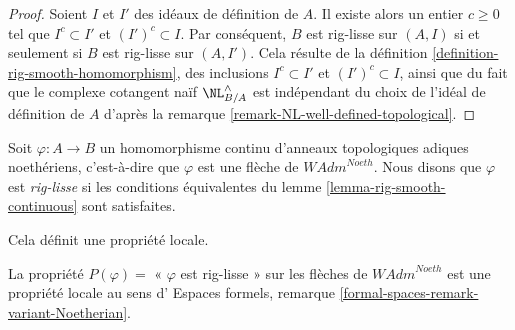 \begin{proof}
Soient $I$ et $I'$ des idéaux de définition de $A$. Il existe alors un
entier $c \geq 0$ tel que $I^c \subset I'$ et $(I')^c \subset I$. Par conséquent,
$B$ est rig-lisse sur $(A, I)$ si et seulement si
$B$ est rig-lisse sur $(A, I')$. Cela résulte de la
définition \ref{definition-rig-smooth-homomorphism},
des inclusions $I^c \subset I'$ et $(I')^c \subset I$, ainsi que
du fait que le complexe cotangent naïf $\NL_{B/A}^\wedge$
est indépendant du choix de l'idéal de définition de $A$ d'après la
remarque \ref{remark-NL-well-defined-topological}.
\end{proof}

\begin{definition}
\label{definition-rig-smooth-continuous-homomorphism}
Soit $\varphi : A \to B$ un homomorphisme continu d'anneaux
topologiques adiques noethériens, c'est-à-dire que $\varphi$
est une flèche de $\textit{WAdm}^{Noeth}$. Nous disons que
$\varphi$ est {\it rig-lisse} si les conditions équivalentes
du lemme \ref{lemma-rig-smooth-continuous} sont satisfaites.
\end{definition}

\noindent
Cela définit une propriété locale.

\begin{lemma}
\label{lemma-rig-smooth-axioms}
La propriété $P(\varphi)=$ « $\varphi$ est rig-lisse » sur les flèches
de $\textit{WAdm}^{Noeth}$ est une propriété locale au sens d'
Espaces formels, remarque \ref{formal-spaces-remark-variant-Noetherian}.
\end{lemma}

